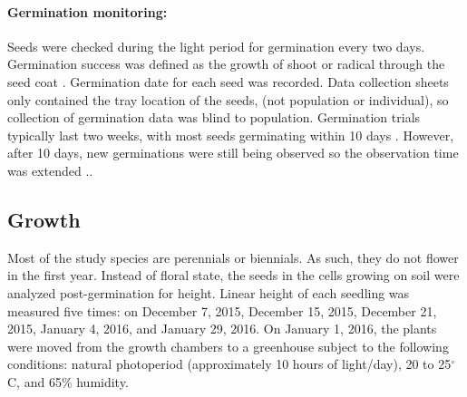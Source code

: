 \documentclass[12pt]{article}\usepackage[]{graphicx}\usepackage[]{color}
\begin{document}
	\paragraph{Germination monitoring:} Seeds were checked during the light period for germination every two days. Germination success was defined as the growth of shoot or radical through the seed coat \parencite{Baskin1998,Popay1970}. Germination date for each seed was recorded. Data collection sheets only contained the tray location of the seeds, (not population or individual), so collection of germination data was blind to population.  Germination trials typically last two weeks, with most seeds germinating within 10 days \parencite{Baskin1998}. However, after 10 days, new germinations were still being observed so the observation time was extended \parencite{Wulff1994}.. 
	
	\subsection{Growth}
 	Most of the study species are perennials or biennials. As such, they do not flower in the first year. Instead of floral state, the seeds in the cells growing on soil were analyzed post-germination for height. Linear height of each seedling was measured five times: on December 7, 2015, December 15, 2015, December 21, 2015, January 4, 2016, and January 29, 2016. On January 1, 2016, the plants were moved from the growth chambers to a greenhouse subject to the following conditions: natural photoperiod (approximately 10 hours of light/day), 20 to 25$^\circ$C, and 65\% humidity.  
	
\end{document}

